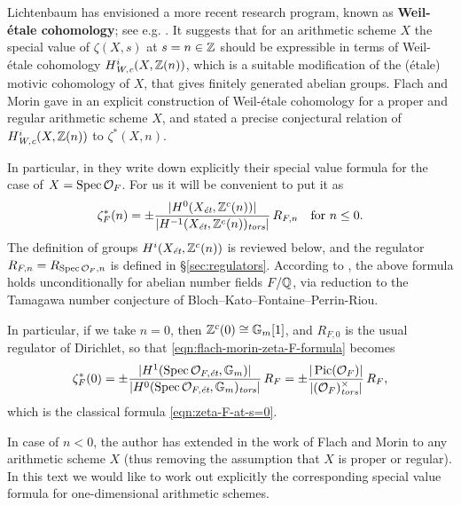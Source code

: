 \documentclass[draft]{article}
\numberwithin{equation}{section}
\begin{document}
\vspace{1em}

Lichtenbaum has envisioned a more recent research program, known as
\textbf{Weil-\'{e}tale cohomology}; see e.g.
\cite{Lichtenbaum-2005,Lichtenbaum-2009-number-rings,Lichtenbaum-2009-Euler-char}.
It suggests that for an arithmetic scheme $X$ the special value of $\zeta (X,s)$
at $s = n \in \ZZ$ should be expressible in terms of Weil-\'{e}tale cohomology
$H^i_\Wc (X,\ZZ(n))$, which is a suitable modification of the (\'{e}tale) motivic
cohomology of $X$, that gives finitely generated abelian groups. Flach and Morin
gave in \cite{Flach-Morin-2018} an explicit construction of Weil-\'{e}tale
cohomology for a proper and regular arithmetic scheme $X$, and stated a precise
conjectural relation of $H^i_\Wc (X,\ZZ(n))$ to $\zeta^* (X,n)$.

In particular, in \cite[\S 5.8.3]{Flach-Morin-2018} they write down explicitly
their special value formula for the case of $X = \Spec \mathcal{O}_F$. For us it
will be convenient to put it as
\begin{equation}
  \label{eqn:flach-morin-zeta-F-formula}
  \zeta_F^* (n) = \pm\frac{|H^0 (X_\et, \ZZ^c (n))|}{|H^{-1} (X_\et, \ZZ^c (n))_\tors|}\,R_{F,n}
  \quad \text{for }n \le 0.
\end{equation}
The definition of groups $H^i (X_\et, \ZZ^c (n))$ is reviewed below, and the
regulator $R_{F,n} = R_{\Spec \mathcal{O}_F,n}$ is defined in
\S\ref{sec:regulators}. According to \cite[Proposition~5.35]{Flach-Morin-2018},
the above formula holds unconditionally for abelian number fields $F/\QQ$, via
reduction to the Tamagawa number conjecture of
Bloch--Kato--Fontaine--Perrin-Riou.

In particular, if we take $n = 0$, then $\ZZ^c (0) \cong \mathbb{G}_m [1]$, and
$R_{F,0}$ is the usual regulator of Dirichlet, so that
\eqref{eqn:flach-morin-zeta-F-formula} becomes
\[ \zeta_F^* (0) =
  \pm \frac{|H^1 (\Spec \mathcal{O}_{F,\et}, \mathbb{G}_m)|}{|H^0 (\Spec \mathcal{O}_{F,\et}, \mathbb{G}_m)_\tors|}\,R_F =
  \pm \frac{|\Pic (\mathcal{O}_F)|}{|(\mathcal{O}_F)^\times_\tors|}\,R_F, \]
which is the classical formula \eqref{eqn:zeta-F-at-s=0}.

In case of $n < 0$, the author has extended in
\cite{Beshenov-Weil-etale-1,Beshenov-Weil-etale-2} the work of Flach and Morin
to any arithmetic scheme $X$ (thus removing the assumption that $X$ is proper or
regular). In this text we would like to work out explicitly the corresponding
special value formula for one-dimensional arithmetic schemes.
\end{document}
